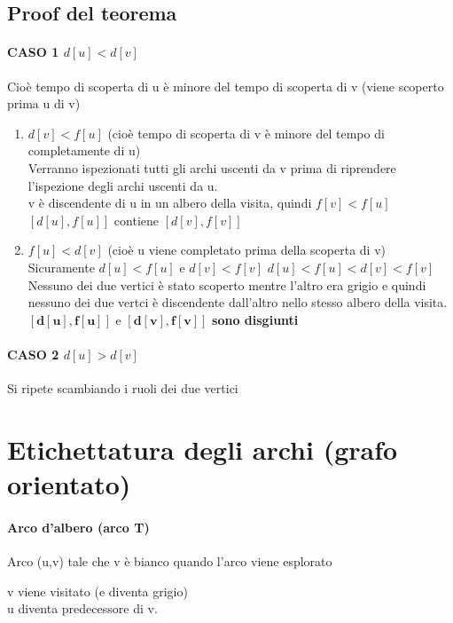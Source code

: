 \subsection{Proof del teorema}
\paragraph*{CASO 1 $d[u]<d[v]$} Cioè tempo di scoperta di u è minore del tempo di scoperta di v (viene
scoperto prima u di v)
\begin{enumerate}
    \item $d[v] < f[u]$ (cioè tempo di scoperta di v è minore del tempo di completamente di u)\\ 
    Verranno ispezionati tutti gli archi uscenti da v prima di riprendere l'ispezione
    degli archi uscenti da u.\\
    \ra v è discendente di u in un albero della visita, quindi \textbf{$f[v]<f[u]$}\\
    \ra $[d[u],f[u]]$ contiene $[d[v],f[v]]$
    \item $f[u]<d[v]$ (cioè u viene completato prima della scoperta di v)\\
    Sicuramente $d[u]<f[u]$ e $d[v] < f[v]$ \ra $d[u] < f[u] < d[v] < f[v]$\\
    Nessuno dei due vertici è stato scoperto mentre l'altro era grigio e quindi
    nessuno dei due vertci è discendente dall'altro nello stesso albero della visita.\\
    \ra $\boldsymbol{[d[u],f[u]]}$ e $\boldsymbol{[d[v],f[v]]}$ \textbf{sono disgiunti}
\end{enumerate}
\paragraph*{CASO 2 $d[u]>d[v]$} Si ripete scambiando i ruoli dei due vertici
\section{Etichettatura degli archi (grafo orientato)}
\paragraph*{Arco d'albero (arco T)} \ra Arco (u,v) tale che v è bianco quando
l'arco viene esplorato
\begin{center}
\end{center}
v viene visitato (e diventa grigio)\\
u diventa predecessore di v.
